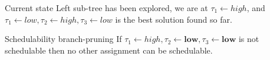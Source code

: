 \documentclass[svgnames,unknownkeysallowed]{beamer}
\begin{document}
\begin{frame}
\begin{tikzpicture}
	\end{tikzpicture}
	
	
	\begin{block}{Current state}
		Left sub-tree has been explored, we are at $\tau_1\gets high$, and\\ 
		$\tau_1 \gets low, \tau_2\gets high, \tau_3 \gets low$ is the best solution found so far.
	\end{block}
	
	\begin{block}{Schedulability branch-pruning}
	If $\tau_1 \gets high, \tau_2\gets \textbf{low}, \tau_3 \gets \textbf{low}$ is not schedulable then no other assignment can be schedulable.
	\end{block}
	
\end{frame}
\end{document}
